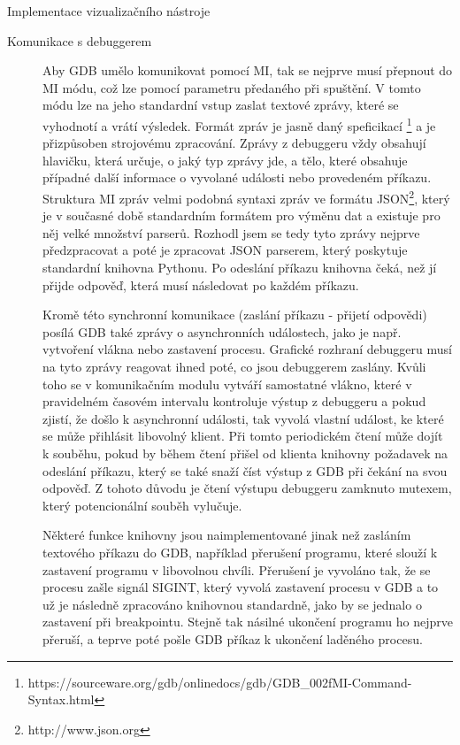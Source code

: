 \documentclass[bc,male,python,dept460]{diploma}						%
\newcommand{\parspace}[1][]{
	\ifthenelse{\isempty{#1}}{\vspace{5mm}}{\vspace{#1}}
	\par
}
\begin{document}
\begin{section}{Implementace vizualizačního nástroje}
		\begin{description}
			\item[Komunikace s debuggerem]
			Aby GDB umělo komunikovat pomocí MI, tak se nejprve musí přepnout do MI módu, což lze pomocí parametru předaného při spuštění. V tomto módu
			lze na jeho standardní vstup zaslat textové zprávy, které se vyhodnotí a vrátí výsledek. Formát zpráv je jasně daný speficikací
			\footnote{https://sourceware.org/gdb/onlinedocs/gdb/GDB\_002fMI-Command-Syntax.html} a je přizpůsoben strojovému zpracování. Zprávy z debuggeru
			vždy obsahují hlavičku, která určuje, o jaký typ zprávy jde, a tělo, které obsahuje případné další informace o vyvolané události nebo
			provedeném příkazu. Struktura MI zpráv velmi podobná syntaxi zpráv ve formátu JSON\footnote{http://www.json.org}, který je v současné době standardním
			formátem pro výměnu dat a existuje pro něj velké množství parserů.
			Rozhodl jsem se tedy tyto zprávy nejprve předzpracovat a poté je zpracovat JSON parserem, který poskytuje
			standardní knihovna Pythonu. %
			Po odeslání příkazu knihovna čeká, než jí přijde odpověď, která musí následovat po každém příkazu.
			
			\parspace Kromě této synchronní komunikace (zaslání příkazu - přijetí odpovědi) posílá GDB také zprávy o asynchronních událostech, jako je např.
			vytvoření vlákna nebo zastavení procesu. Grafické rozhraní debuggeru musí na tyto zprávy reagovat ihned poté, co jsou debuggerem zaslány.
			Kvůli toho se v komunikačním modulu vytváří samostatné vlákno, které v pravidelném časovém intervalu kontroluje výstup z debuggeru a pokud zjistí, že došlo
			k asynchronní události, tak vyvolá vlastní událost, ke které se může přihlásit libovolný klient. Při tomto periodickém čtení může dojít k souběhu, pokud
			by během čtení přišel od klienta knihovny požadavek na odeslání příkazu, který se také snaží číst výstup z GDB při čekání na svou odpověď.
			Z tohoto důvodu je čtení výstupu debuggeru zamknuto mutexem, který potencionální souběh vylučuje.
			
			\parspace Některé funkce knihovny jsou naimplementované jinak než zasláním textového příkazu do GDB, například přerušení programu, které
			slouží k zastavení programu v libovolnou chvíli. Přerušení je vyvoláno tak, že se procesu zašle signál SIGINT, který vyvolá zastavení procesu v GDB a to
			už je následně zpracováno knihovnou standardně, jako by se jednalo o zastavení při breakpointu. Stejně tak násilné ukončení programu ho nejprve přeruší,
			a teprve poté pošle GDB příkaz k ukončení laděného procesu.
			

\end{description}
\end{section}
\end{document}
